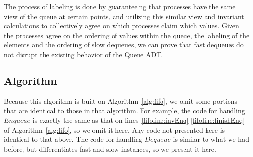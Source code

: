 \documentclass[a4paper,anonymous,USenglish]{lipics-v2021} %
\theoremstyle{definition}
\begin{document}
The process of labeling is done by guaranteeing that processes have the same view of the queue at certain points, and utilizing this similar view and invariant calculations to collectively agree on which processes claim which values. Given the processes agree on the ordering of values within the queue, the labeling of the elements and the ordering of slow dequeues, we can prove that fast dequeues do not disrupt the existing behavior of the Queue ADT. 
\subsection{Algorithm}

Because this algorithm is built on Algorithm~\ref{alg:fifo}, we omit some portions that are identical to those in that algorithm.  For example, the code for handling $Enqueue$ is exactly the same as that on lines~\ref{fifoline:invEnq}-\ref{fifoline:finishEnq} of Algorithm~\ref{alg:fifo}, so we omit it here.  Any code not presented here is identical to that above.  The code for handling $Dequeue$ is similar to what we had before, but differentiates fast and slow instances, so we present it here. 
\end{document}
